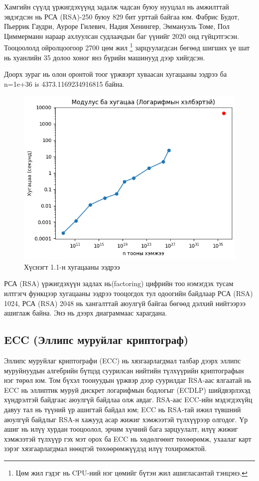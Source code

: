 	Хамгийн сүүлд үржигдэхүүнд задалж чадсан буюу нууцлал нь амжилттай эвдэгдсэн нь РСА (RSA)-250 буюу 829 бит урттай байгаа юм. Фабрис Будот, Пьеррик Гаудри, Ауроре Гилевич, Надия Хенингер, Эммануэль Томе, Пол Циммерманн нараар ахлуулсан судлаачдын баг үүнийг 2020 онд гүйцэтгэсэн. Тооцоололд ойролцоогоор 2700 цөм жил \footnote{Цөм жил гэдэг нь CPU-ний нэг цөмийг бүтэн жил ашигласантай тэнцэнэ.} зарцуулагдсан бөгөөд шигших үе шат нь хуанлийн 35 долоо хоног янз бүрийн машинууд дээр хийгдсэн.

	Доорх зураг нь олон оронтой тоог үржвэрт хуваасан хугацааны ээдрээ ба n=1e+36 is 4373.1169234916815 байна.

	\begin{figure}[h]
		\centering
		\includegraphics[scale=0.9]{assets/rsacomplexity.png}
		\caption{Хүснэгт 1.1-н хугацааны ээдрээ}
		\label{fig:rsacomplexity}
	\end{figure}

РСА (RSA) үржигдэхүүн задлах нь(factoring) цифрийн тоо нэмэгдэх тусам илтгэгч функцээр хугацааны ээдрээ тооцогдох тул одоогийн байдлаар РСА (RSA) 1024, РСА (RSA) 2048 нь хангалттай аюулгүй байгаа бөгөөд дэлхий нийтээрээ ашиглаж байна. Энэ нь дээрх диаграммаас харагдана.

\subsection{ECC (Эллипс муруйлаг криптограф)}

Эллипс муруйлаг криптографи (ECC) нь хязгаарлагдмал талбар дээрх эллипс муруйнуудын алгебрийн бүтцэд суурилсан нийтийн түлхүүрийн криптографын нэг төрөл юм. Том бүхэл тоонуудын үржвэр дээр суурилдаг RSA-аас ялгаатай нь ECC нь эллиптик муруй дискрет логарифмын бодлогыг (ECDLP) шийдвэрлэхэд хүндрэлтэй байдгаас аюулгүй байдлаа олж авдаг. RSA-аас ECC-ийн мэдэгдэхүйц давуу тал нь түүний үр ашигтай байдал юм; ECC нь RSA-тай ижил түвшний аюулгүй байдлыг RSA-н хажууд асар жижиг хэмжээтэй түлхүүрээр олгодог. Үр ашиг нь илүү хурдан тооцоолол, эрчим хүчний бага зарцуулалт, илүү жижиг хэмжээтэй түлхүүр гэх мэт орох ба ECC нь хөдөлгөөнт төхөөрөмж, ухаалаг карт зэрэг хязгаарлагдмал нөөцтэй төхөөрөмжүүдэд илүү тохиромжтой.
